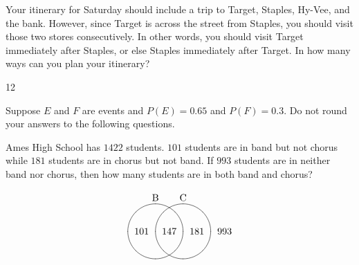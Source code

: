 \documentclass[answers,addpoints,12pt]{exam}
\begin{document}
\begin{questions}
\ifprintanswers\else\newpage\fi

\question[15] Your itinerary for Saturday should
include a trip to Target, Staples, Hy-Vee, and the bank.
However, since Target is across the street from Staples,
you should visit those two stores consecutively. In other
words, you should visit Target immediately after Staples, or else
Staples immediately after Target. In how many ways
can you plan your itinerary?
\begin{solution}[4in]12\end{solution}

\question[12] Suppose $E$ and $F$ are events
and $P\left(E\right)=0.65$ and $P\left(F\right)=0.3$.
Do not round your answers to the following questions.
\ifprintanswers\else\newpage\fi

\question[12] Ames High School has $1422$ students.
$101$ students are in band but not chorus while
$181$ students are in chorus but not band.
If $993$ students are in neither band nor chorus,
then how many students are in both band and chorus?
\begin{solution}[4in]
\[\begin{xy}<.5cm,0cm>:
(-1,2)*+!D{\text{B}};
(1,2)*+!D{\text{C}};
(-1,0)*\cir<1cm>{};
(1,0)*\cir<1cm>{};
(0,0)*{147};
(-2,0)*{101};
(2,0)*{181};
(4,0)*{993};
\end{xy}\]
\end{solution}


\end{questions}
\end{document}
